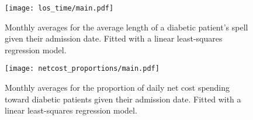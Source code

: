 \begin{figure}[htbp]
    \centering
    \texttt{[image: los\_time/main.pdf]}
    \caption{Monthly averages for the average length of a diabetic patient's
        spell given their admission date. Fitted with a linear least-squares
        regression model.}%
    \label{fig:los_time}
\end{figure}

\begin{figure}[htbp]
    \centering
    \texttt{[image: netcost\_proportions/main.pdf]}
    \caption{Monthly averages for the proportion of daily net cost spending
        toward diabetic patients given their admission date. Fitted with a
        linear least-squares regression model.}%
    \label{fig:netcost_proportions}
\end{figure}
